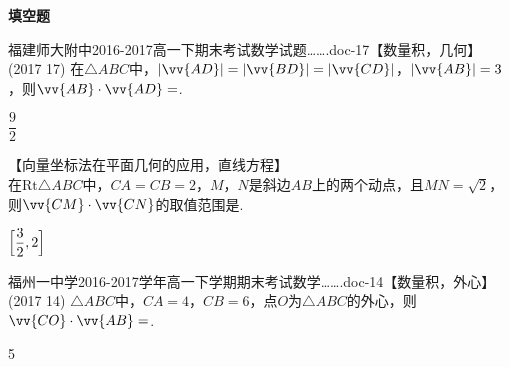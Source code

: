 \begin{exercise}{\bf 填空题}
{\begin{minipage}[htbp!]{0.3\linewidth}
\begin{center}
       \end{center}
     \end{minipage}}
    \item 福建师大附中2016-2017高一下期末考试数学试题…….doc-17【数量积，几何】\\
     (2017  17)
     在$\triangle{ABC}$中，$|\vv{AD}|=|\vv{BD}|=|\vv{CD}|$，$|\vv{AB}|=3$，则$\vv{AB}\cdot\vv{AD}=$\tk.
     \begin{answer}
       $\dfrac92$
     \end{answer}
    \item 【向量坐标法在平面几何的应用，直线方程】\\
     在$\mathrm{Rt}\triangle{ABC}$中，$CA=CB=2$，$M$，$N$是斜边$AB$上的两个动点，且$MN=\sqrt{2}$，则$\vv{CM}\cdot\vv{CN}$的取值范围是\tk.
     \begin{answer}
       $\Bigl[\dfrac{3}2,2\Bigr]$
     \end{answer}
    \item 福州一中学2016-2017学年高一下学期期末考试数学…….doc-14【数量积，外心】\\
     (2017  14)
     $\triangle{ABC}$中，$CA=4$，$CB=6$，点$O$为$\triangle{ABC}$的外心，则$\vv{CO}\cdot\vv{AB}=$\tk.
     \begin{answer}
       5
     \end{answer}
  \end{exercise}
